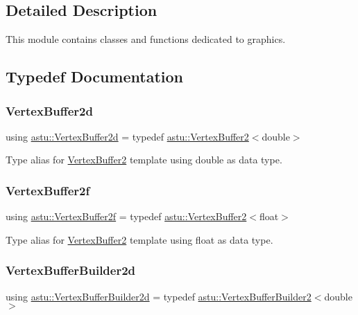 \subsection{Detailed Description}
This module contains classes and functions dedicated to graphics. 



\subsection{Typedef Documentation}
\mbox{\label{group__gfx__group_ga0984042ea57451b25cc703c049481e98}} 
\subsubsection{\texorpdfstring{Vertex\+Buffer2d}{VertexBuffer2d}}
{\footnotesize\ttfamily using \hyperlink{group__gfx__group_ga0984042ea57451b25cc703c049481e98}{astu\+::\+Vertex\+Buffer2d} = typedef \hyperlink{classastu_1_1VertexBuffer2}{astu\+::\+Vertex\+Buffer2}$<$double$>$}

Type alias for \hyperlink{classastu_1_1VertexBuffer2}{Vertex\+Buffer2} template using double as data type. \mbox{\label{group__gfx__group_ga081cf45a441eef100dfbb1e0f64c3826}} 
\subsubsection{\texorpdfstring{Vertex\+Buffer2f}{VertexBuffer2f}}
{\footnotesize\ttfamily using \hyperlink{group__gfx__group_ga081cf45a441eef100dfbb1e0f64c3826}{astu\+::\+Vertex\+Buffer2f} = typedef \hyperlink{classastu_1_1VertexBuffer2}{astu\+::\+Vertex\+Buffer2}$<$float$>$}

Type alias for \hyperlink{classastu_1_1VertexBuffer2}{Vertex\+Buffer2} template using float as data type. \mbox{\label{group__gfx__group_ga91f7837593de4dabdf0abf59d5fa1889}} 
\subsubsection{\texorpdfstring{Vertex\+Buffer\+Builder2d}{VertexBufferBuilder2d}}
{\footnotesize\ttfamily using \hyperlink{group__gfx__group_ga91f7837593de4dabdf0abf59d5fa1889}{astu\+::\+Vertex\+Buffer\+Builder2d} = typedef \hyperlink{classastu_1_1VertexBufferBuilder2}{astu\+::\+Vertex\+Buffer\+Builder2}$<$double$>$}

